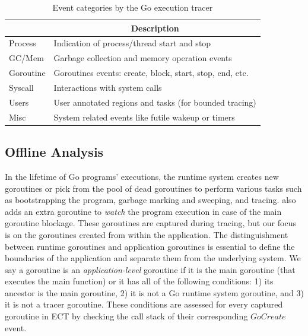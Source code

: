 \begin{table}[]
    \centering
        \caption{Event categories by the Go execution tracer}
        \begin{tabular}{|l|l|}
        \hline
        \rowcolor[HTML]{C0C0C0}
        \multicolumn{1}{|c|}{\cellcolor[HTML]{C0C0C0}\textbf{Category}} & \multicolumn{1}{c|}{\cellcolor[HTML]{C0C0C0}\textbf{Description}} \\ \hline
        Process & Indication of process/thread start and stop \\ \hline
        GC/Mem & Garbage collection and memory operation events\\ \hline
        Goroutine & Goroutines events: create, block, start, stop, end, etc. \\ \hline
        Syscall & Interactions with system calls \\ \hline
        Users & User annotated regions and tasks (for bounded tracing) \\ \hline
        Misc & System related events like futile wakeup or timers \\ \hline
        \end{tabular}
    \label{tab:events}
\end{table}



\subsection{Offline Analysis}
\label{sec:offline_analysis}
In the lifetime of Go programs' executions, the runtime system creates new goroutines or pick from the pool of dead goroutines to perform various tasks such as bootstrapping the program, garbage marking and sweeping, and tracing.
%
\goat also adds an extra goroutine to \textit{watch} the program execution in case of the main goroutine blockage.
%
These goroutines are captured during tracing, but our focus is on the goroutines created from within the application.
%
The distinguishment between runtime goroutines and application goroutines is essential to define the boundaries of the application and separate them from the underlying system.
%
We say a goroutine is an \textit{application-level} goroutine if it is the main goroutine (that executes the main function) or it has all of the following conditions:
1) its ancestor is the main goroutine,
2) it is not a Go runtime system goroutine, and
3) it is not a tracer goroutine.
These conditions are assessed for every captured goroutine in ECT by checking the call stack of their corresponding $GoCreate$ event.

